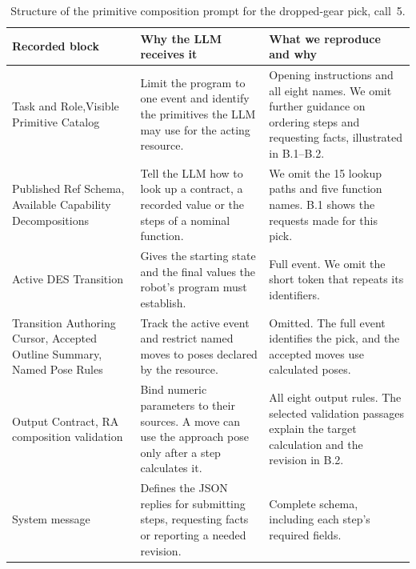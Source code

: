 \documentclass[preprint,12pt,authoryear]{elsarticle}
\begin{document}
\begin{table}[h!]
\centering\small
\caption{Structure of the primitive composition prompt for the dropped-gear pick, call~5.}\label{tab:composition-blocks}
\begin{tabularx}{\linewidth}{@{}>{\raggedright\arraybackslash}p{.22\linewidth}YY@{}}
\toprule
Recorded block & Why the LLM receives it & What we reproduce and why \\
\midrule
Task and Role,\newline Visible Primitive Catalog & Limit the program to one event and identify the primitives the LLM may use for the acting resource. & Opening instructions and all eight names. We omit further guidance on ordering steps and requesting facts, illustrated in B.1--B.2. \\
\addlinespace
Published Ref Schema, Available Capability Decompositions & Tell the LLM how to look up a contract, a recorded value or the steps of a nominal function. & We omit the 15 lookup paths and five function names. B.1 shows the requests made for this pick. \\
\addlinespace
Active DES Transition & Gives the starting state and the final values the robot's program must establish. & Full event. We omit the short token that repeats its identifiers. \\
\addlinespace
Transition Authoring Cursor, Accepted Outline Summary, Named Pose Rules & Track the active event and restrict named moves to poses declared by the resource. & Omitted. The full event identifies the pick, and the accepted moves use calculated poses. \\
\addlinespace
Output Contract, RA composition validation & Bind numeric parameters to their sources. A move can use the approach pose only after a step calculates it. & All eight output rules. The selected validation passages explain the target calculation and the revision in B.2. \\
\addlinespace
System message & Defines the JSON replies for submitting steps, requesting facts or reporting a needed revision. & Complete schema, including each step's required fields. \\
\bottomrule
\end{tabularx}
\end{table}
\end{document}
